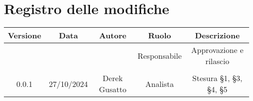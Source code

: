 
\section*{Registro delle modifiche}
\begin{table}[H]
    \begin{tabular}{|c|c|c|c|c|}
        \hline
         \textbf{Versione} &  \textbf{Data} &  \textbf{Autore} &  \textbf{Ruolo} & \textbf{Descrizione} \\
          \hline
          &  &  & Responsabile & Approvazione e rilascio\\
          \hline
          &  &  &  &  \\
          \hline
          0.0.1&  27/10/2024&Derek Gusatto  & Analista &  Stesura §1, §3, §4,  §5\\
          \hline
    \end{tabular}
\end{table}